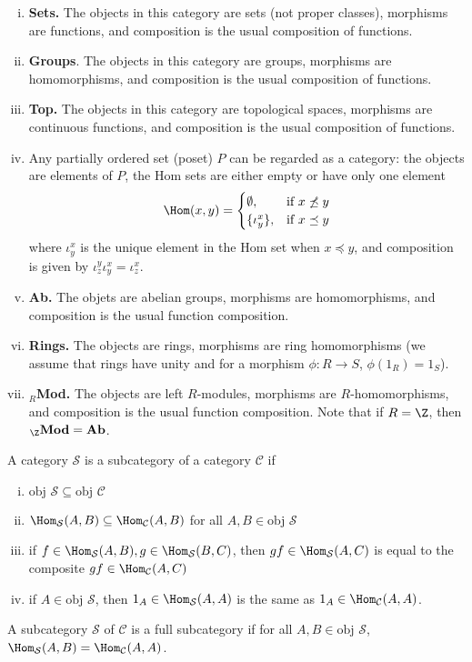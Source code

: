 \begin{ex} \hfill
\begin{enumerate}[(i)]
\item \textbf{Sets.} The objects in this category are sets (not proper classes), morphisms are functions, and composition is the usual composition of functions. 
\item \textbf{Groups}. The objects in this category are groups, morphisms are homomorphisms, and composition is the usual composition of functions.
\item \textbf{Top.} The objects in this category are topological spaces, morphisms are continuous functions, and composition is the usual composition of functions. 
\item Any partially ordered set (poset) $P$ can be regarded as a category: the objects are elements of $P$, the Hom sets are either empty or have only one element
	\[
	\Hom(x,y)=
	\begin{cases}
	\emptyset, & \text{if } x \not\preceq y \\
	\{\iota_y^x\}, & \text{if } x \preceq y
	\end{cases}
	\]
where $\iota_y^x$ is the unique element in the Hom set when $x \preceq y$, and composition is given by $\iota_z^y \iota_y^x=\iota_z^x$. 

\item \textbf{Ab.} The objets are abelian groups, morphisms are homomorphisms, and composition is the usual function composition.

\item \textbf{Rings.} The objects are rings, morphisms are ring homomorphisms (we assume that rings have unity and for a morphism $\phi: R \to S$, $\phi(1_R)=1_S$).

\item $_R$\textbf{Mod.} The objects are left $R$-modules, morphisms are $R$-homomorphisms, and composition is the usual function composition. Note that if $R=\Z$, then $_\Z\textbf{Mod}=\textbf{Ab}$.
\end{enumerate} \xqed
\end{ex}


\begin{dfn}[Subcategory]
A category $\mathcal{S}$ is a subcategory of a category $\mathcal{C}$ if
	\begin{enumerate}[(i)]
	\item $\text{obj } \mathcal{S} \subseteq \text{obj }\mathcal{C}$
	\item $\Hom_\mathcal{S}(A,B) \subseteq \Hom_\mathcal{C}(A,B)$ for all $A,B \in \text{obj }\mathcal{S}$
	\item if $f \in \Hom_\mathcal{S}(A,B), g \in \Hom_\mathcal{S}(B,C)$, then $gf\in\Hom_\mathcal{S}(A,C)$ is equal to the composite $gf \in \Hom_\mathcal{C}(A,C)$
	\item if $A \in \text{obj } \mathcal{S}$, then $1_A \in \Hom_\mathcal{S}(A,A)$ is the same as $1_A \in \Hom_\mathcal{C}(A,A)$. 
	\end{enumerate}
A subcategory $\mathcal{S}$ of $\mathcal{C}$ is a full subcategory if for all $A,B \in \text{obj }\mathcal{S}$, $\Hom_\mathcal{S}(A,B) = \Hom_\mathcal{C}(A,A)$. 
\end{dfn}


